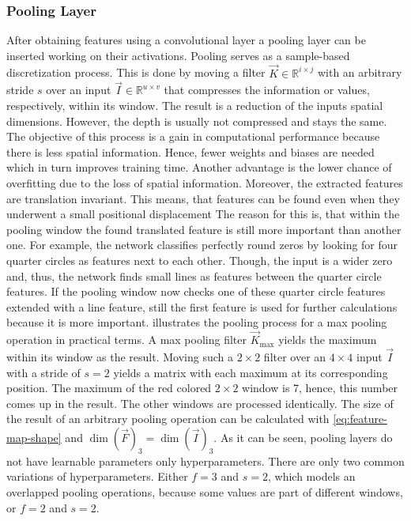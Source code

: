 \subsubsection{Pooling Layer}
\label{sec:cnn-pooling-layer}
After obtaining features using a convolutional layer a pooling layer can be inserted working on their activations.
Pooling serves as a sample-based discretization process.
This is done by moving a filter $\vec{K} \in \mathbb{R}^{i \times j}$ with an arbitrary stride $s$ over an input $\vec{I} \in \mathbb{R}^{u \times v}$ that compresses the information or values, respectively, within its window.
The result is a reduction of the inputs spatial dimensions.
However, the depth is usually not compressed and stays the same.
The objective of this process is a gain in computational performance because there is less spatial information.
Hence, fewer weights and biases are needed which in turn improves training time.
Another advantage is the lower chance of overfitting due to the loss of spatial information.
Moreover, the extracted features are translation invariant.
This means, that features can be found even when they underwent a small positional displacement
The reason for this is, that within the pooling window the found translated feature is still more important than another one.
For example, the network classifies perfectly round zeros by looking for four quarter circles as features next to each other.
Though, the input is a wider zero and, thus, the network finds small lines as features between the quarter circle features.
If the pooling window now checks one of these quarter circle features extended with a line feature, still the first feature is used for further calculations because it is more important.
 illustrates the pooling process for a max pooling operation in practical terms.
A max pooling filter $\vec{K}_{\text{max}}$ yields the maximum within its window as the result.
Moving such a $2 \times 2$ filter over an $4 \times 4$ input $\vec{I}$ with a stride of $s=2$ yields a matrix with each maximum at its corresponding position.
The maximum of the red colored $2 \times 2$ window is 7, hence, this number comes up in the result.
The other windows are processed identically.
The size of the result of an arbitrary pooling operation can be calculated with \eqref{eq:feature-map-shape} and $\dim \left( \vec{F} \right)_3 = \dim \left( \vec{I} \right)_3$.
As it can be seen, pooling layers do not have learnable parameters only hyperparameters.
There are only two common variations of hyperparameters.
Either $f=3$ and $s=2$, which models an overlapped pooling operations, because some values are part of different windows, or $f=2$ and $s=2$.
